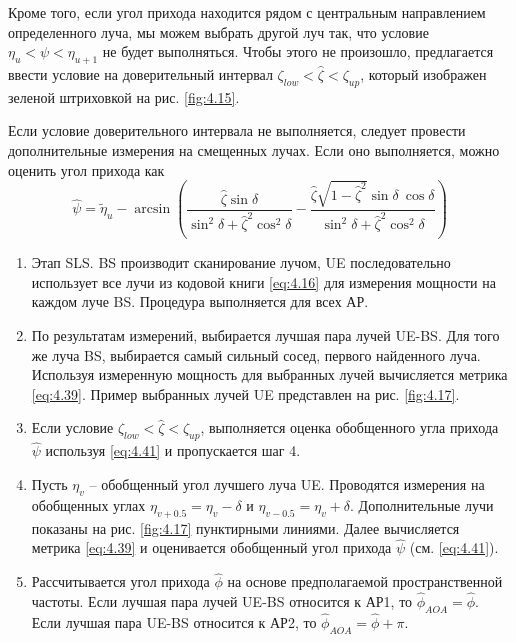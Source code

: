 Кроме того, если угол прихода находится рядом с центральным направлением определенного
луча, мы можем выбрать другой луч так, что условие $\eta_u<\psi < \eta_{u+1}$ не будет выполняться.
Чтобы этого не произошло, предлагается ввести условие на доверительный интервал
$\zeta_{low}<\hat \zeta < \zeta_{up}$, который изображен зеленой штриховкой  на рис.
\ref{fig:4.15}.

Если условие доверительного интервала не выполняется, следует провести дополнительные измерения на смещенных лучах.
Если оно выполняется, можно оценить угол прихода как
\begin{equation}
    \label{eq:4.41}
    \hat \psi = \tilde \eta_u - \arcsin(
    \frac{\hat \zeta \sin\delta}{\sin^2\delta + \hat \zeta^2 \cos^2\delta} -
    \frac{\hat \zeta \sqrt{1- \hat \zeta^2} \sin\delta\ \cos\delta}{\sin^2\delta + \hat \zeta^2 \cos^2\delta}
    )
\end{equation}
\begin{enumerate}[label=\textbf{Шаг \arabic*:}]
    \item Этап SLS. BS производит сканирование лучом, UE
          последовательно использует все лучи из кодовой книги \eqref{eq:4.16} для
          измерения мощности на каждом луче BS. Процедура выполняется для всех АР.
    \item По результатам измерений, выбирается лучшая пара лучей UE-BS. Для того же луча BS,
          выбирается самый сильный сосед, первого найденного луча. Используя измеренную мощность для выбранных лучей
          вычисляется метрика \eqref{eq:4.39}. Пример выбранных лучей UE представлен на рис. \ref{fig:4.17}.
    \item Если условие $\zeta_{low} < \hat \zeta < \zeta_{up}$, выполняется оценка обобщенного угла прихода $\hat \psi$ используя \eqref{eq:4.41} и пропускается шаг 4.
    \item Пусть $\eta_v$ -- обобщенный угол лучшего луча UE. Проводятся измерения на обобщенных углах
          $\eta_{v+0.5} = \eta_v - \delta$ и
          $\eta_{v-0.5} = \eta_v + \delta$. Дополнительные лучи показаны на рис. \ref{fig:4.17} пунктирными линиями. Далее вычисляется метрика \eqref{eq:4.39}
          и оценивается обобщенный угол прихода $\hat \psi$ (см. \eqref{eq:4.41}).
    \item Рассчитывается угол прихода $\hat \phi$ на основе предполагаемой пространственной частоты. Если лучшая пара лучей UE-BS
          относится к АР1, то $\hat \phi_{AOA} = \hat \phi$. Если лучшая пара UE-BS относится к АР2, то $\hat \phi_{AOA} = \hat \phi + \pi$.
\end{enumerate}

